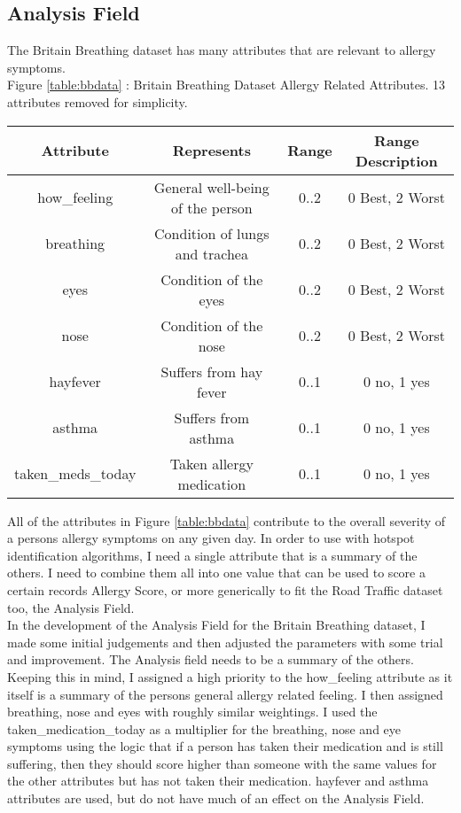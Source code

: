 \subsection{Analysis Field}
\label{sec:anal}

The Britain Breathing dataset has many attributes that are relevant to allergy symptoms.\\

Figure \ref{table:bbdata} : Britain Breathing Dataset Allergy Related Attributes. 13 attributes removed for simplicity.\\\label{table:bbdata}
\begin{tabular}{|c|c|c|c|}\hline\hline
Attribute&Represents&Range&Range Description\\\hline
how\_feeling&General well-being of the person&0..2&0 Best, 2 Worst\\
breathing&Condition of lungs and trachea&0..2&0 Best, 2 Worst\\
eyes&Condition of the eyes&0..2&0 Best, 2 Worst\\
nose&Condition of the nose&0..2&0 Best, 2 Worst\\
hayfever&Suffers from hay fever&0..1&0 no, 1 yes\\
asthma&Suffers from asthma&0..1&0 no, 1 yes\\
taken\_meds\_today&Taken allergy medication&0..1&0 no, 1 yes\\\hline\hline
\end{tabular}

All of the attributes in Figure \ref{table:bbdata} contribute to the overall severity of a persons allergy symptoms on any given day. In order to use with hotspot identification algorithms, I need a single attribute that is a summary of the others. I need to combine them all into one value that can be used to score a certain records Allergy Score, or more generically to fit the Road Traffic dataset too, the Analysis Field.\\

In the development of the Analysis Field for the Britain Breathing dataset, I made some initial judgements and then adjusted the parameters with some trial and improvement. The Analysis field needs to be a summary of the others. Keeping this in mind, I assigned a high priority to the how\_feeling attribute as it itself is a summary of the persons general allergy related feeling. I then assigned breathing, nose and eyes with roughly similar weightings. I used the taken\_medication\_today as a multiplier for the breathing, nose and eye symptoms using the logic that if a person has taken their medication and is still suffering, then they should score higher than someone with the same values for the other attributes but has not taken their medication. hayfever and asthma attributes are used, but do not have much of an effect on the Analysis Field.\\

